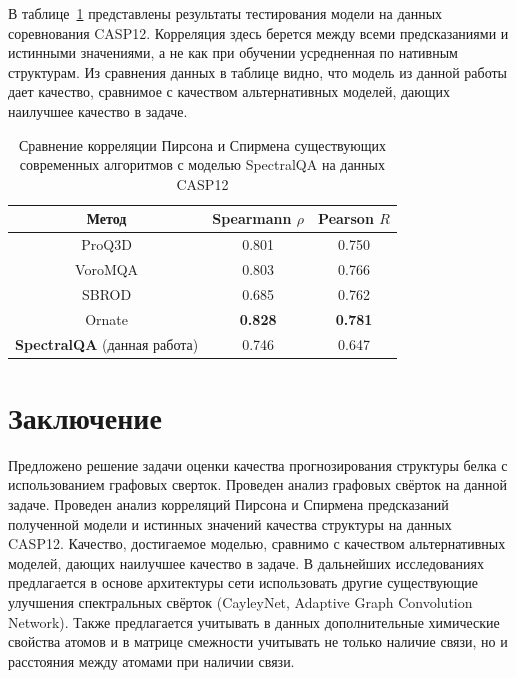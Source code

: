 \documentclass[14pt]{extarticle}
\begin{document}
В таблице~\ref{Tab:results} представлены результаты тестирования модели на данных соревнования CASP12. Корреляция здесь берется между всеми предсказаниями и истинными значениями, а не как при обучении усредненная по нативным структурам. Из сравнения данных в таблице видно, что модель из данной работы дает качество, сравнимое с качеством альтернативных моделей, дающих наилучшее качество в задаче.
\begin{center}
	\begin{table}[H]
		\centering
		\caption{Сравнение корреляции Пирсона и Спирмена существующих современных алгоритмов с моделью SpectralQA на данных CASP12}
		\begin{tabular}{ccc}
			\hline Метод & Spearmann $\rho$ &  Pearson $R$ \\
			\hline ProQ3D & 0.801 & 0.750 \\
			VoroMQA & 0.803 & 0.766  \\
			SBROD & 0.685 & 0.762  \\
			Ornate & \textbf{0.828} & \textbf{0.781}   \\
			\textbf{SpectralQA} (данная работа) &   {0.746}&   0.647   \\
			\hline 
		\end{tabular}
		\label{Tab:results}
	\end{table}
\end{center}

\newpage
\section*{Заключение}

Предложено решение задачи оценки качества прогнозирования структуры белка с использованием графовых сверток. Проведен анализ графовых свёрток на данной задаче. Проведен анализ корреляций Пирсона и Спирмена предсказаний полученной модели и истинных значений качества структуры на данных CASP12. Качество, достигаемое моделью, сравнимо с качеством альтернативных моделей, дающих наилучшее качество в задаче. В дальнейших исследованиях предлагается в основе архитектуры сети использовать другие существующие улучшения спектральных свёрток (CayleyNet, Adaptive Graph Convolution Network). Также предлагается учитывать в данных дополнительные химические свойства атомов и в матрице смежности учитывать не только наличие связи, но и расстояния между атомами при наличии связи.

\newpage

\newpage
{}


\nocite{*}
\end{document}
